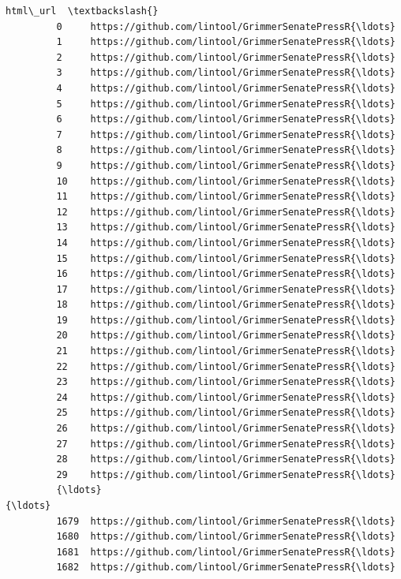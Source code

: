 \documentclass[11pt]{article}
\begin{document}
\begin{Verbatim}[commandchars=\\\{\}]
                                                        html\_url  \textbackslash{}
         0     https://github.com/lintool/GrimmerSenatePressR{\ldots}   
         1     https://github.com/lintool/GrimmerSenatePressR{\ldots}   
         2     https://github.com/lintool/GrimmerSenatePressR{\ldots}   
         3     https://github.com/lintool/GrimmerSenatePressR{\ldots}   
         4     https://github.com/lintool/GrimmerSenatePressR{\ldots}   
         5     https://github.com/lintool/GrimmerSenatePressR{\ldots}   
         6     https://github.com/lintool/GrimmerSenatePressR{\ldots}   
         7     https://github.com/lintool/GrimmerSenatePressR{\ldots}   
         8     https://github.com/lintool/GrimmerSenatePressR{\ldots}   
         9     https://github.com/lintool/GrimmerSenatePressR{\ldots}   
         10    https://github.com/lintool/GrimmerSenatePressR{\ldots}   
         11    https://github.com/lintool/GrimmerSenatePressR{\ldots}   
         12    https://github.com/lintool/GrimmerSenatePressR{\ldots}   
         13    https://github.com/lintool/GrimmerSenatePressR{\ldots}   
         14    https://github.com/lintool/GrimmerSenatePressR{\ldots}   
         15    https://github.com/lintool/GrimmerSenatePressR{\ldots}   
         16    https://github.com/lintool/GrimmerSenatePressR{\ldots}   
         17    https://github.com/lintool/GrimmerSenatePressR{\ldots}   
         18    https://github.com/lintool/GrimmerSenatePressR{\ldots}   
         19    https://github.com/lintool/GrimmerSenatePressR{\ldots}   
         20    https://github.com/lintool/GrimmerSenatePressR{\ldots}   
         21    https://github.com/lintool/GrimmerSenatePressR{\ldots}   
         22    https://github.com/lintool/GrimmerSenatePressR{\ldots}   
         23    https://github.com/lintool/GrimmerSenatePressR{\ldots}   
         24    https://github.com/lintool/GrimmerSenatePressR{\ldots}   
         25    https://github.com/lintool/GrimmerSenatePressR{\ldots}   
         26    https://github.com/lintool/GrimmerSenatePressR{\ldots}   
         27    https://github.com/lintool/GrimmerSenatePressR{\ldots}   
         28    https://github.com/lintool/GrimmerSenatePressR{\ldots}   
         29    https://github.com/lintool/GrimmerSenatePressR{\ldots}   
         {\ldots}                                                 {\ldots}   
         1679  https://github.com/lintool/GrimmerSenatePressR{\ldots}   
         1680  https://github.com/lintool/GrimmerSenatePressR{\ldots}   
         1681  https://github.com/lintool/GrimmerSenatePressR{\ldots}   
         1682  https://github.com/lintool/GrimmerSenatePressR{\ldots}   

\end{Verbatim}
\end{document}
